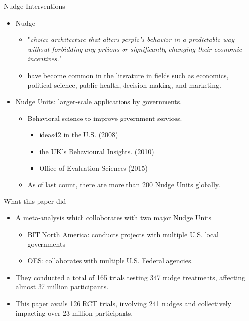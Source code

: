 \documentclass[dvipdfmx,11pt]{beamer}
\begin{document}
\begin{frame}{Nudge Interventions}
  \begin{itemize}
    \item Nudge 
    \begin{itemize}
      \item "\textit{choice architecture that alters perple's behavior in a predictable way without forbidding any prtions or significantly changing their economic incentives.}"
      \item have become common in the literature in fields such as economics, political science, public health, decision-making, and marketing.
    \end{itemize}
    \item Nudge Units: larger-scale applications by governments.
    \begin{itemize}
      \item Behavioral science to improve government services.
      \begin{itemize}
        \item ideas42 in the U.S. (2008)
        \item the UK's Behavioural Insights. (2010)
        \item Office of Evaluation Sciences (2015)
      \end{itemize}
      \item As of last count, there are more than 200 Nudge Units globally.
    \end{itemize}
  \end{itemize}
\end{frame}

\begin{frame}{What this paper did}
  \begin{itemize}
    \item A meta-analysis which colloborates with two major Nudge Units
    \begin{itemize}
      \item BIT North America: conducts projects with multiple U.S. local governments 
      \item OES: collaborates with multiple U.S. Federal agencies.
    \end{itemize}
    \item They conducted a total of 165 trials testing 347 nudge treatments, affecting almost 37 million participants.
    \item This paper avails 126 RCT trials, involving 241 nudges and collectively impacting over 23 million participants.
  \end{itemize}
\end{frame}
\end{document}
